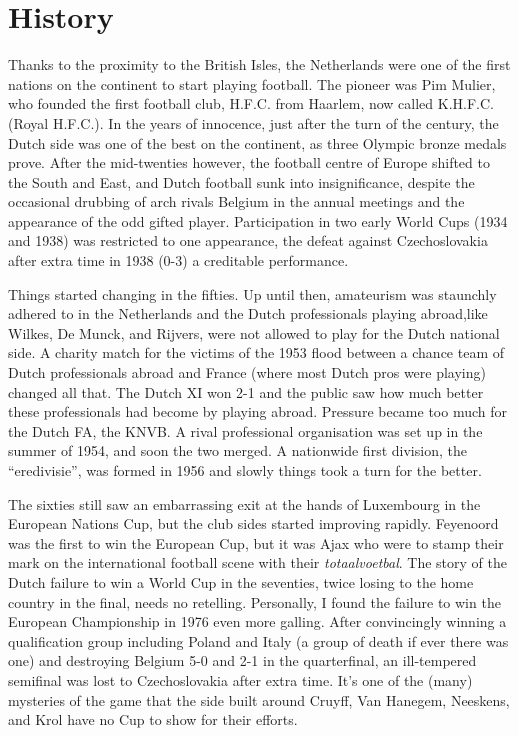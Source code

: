 \section{History}
Thanks to the proximity to the British Isles, the Netherlands were one of the 
first nations on the continent to start playing football. The pioneer was Pim 
Mulier, who founded the first football club, H.F.C. from Haarlem, now called 
K.H.F.C. (Royal H.F.C.). In the years of innocence, just after the turn of the 
century, the Dutch side was one of the best on the continent, as three Olympic 
bronze medals prove. After the mid-twenties however, the football centre of 
Europe shifted to the South and East, and Dutch football sunk into 
insignificance, despite the occasional drubbing of arch rivals Belgium in the 
annual meetings and the appearance of the odd gifted player. Participation in 
two early World Cups (1934 and 1938) was restricted to one appearance, the 
defeat against Czechoslovakia after extra time in 1938 (0-3) a creditable 
performance.

Things started changing in the fifties. Up until then, amateurism was staunchly
adhered to in the Netherlands and the Dutch professionals playing abroad,like 
Wilkes, De Munck, and Rijvers, were not allowed to play for the Dutch national
side. A charity match for the victims of the 1953 flood between a chance team 
of Dutch professionals abroad and France (where most Dutch pros were playing) 
changed all that. The Dutch XI won 2-1 and the public saw how much better these
professionals had become by playing abroad. Pressure became too much for the 
Dutch FA, the KNVB. A rival professional organisation was set up in the summer
of 1954, and soon the two merged. A nationwide first division, the ``eredivisie'',
was formed in 1956 and slowly things took a turn for the better.

The sixties still saw an embarrassing exit at the hands of Luxembourg in the
European Nations Cup, but the club sides started improving rapidly. Feyenoord
was the first to win the European Cup, but it was Ajax who were to stamp their
mark on the international football scene with their \textit{totaalvoetbal}. The story
of the Dutch failure to win a World Cup in the seventies, twice losing to the 
home country in the final, needs no retelling. Personally, I found the failure
to win the European Championship in 1976 even more galling. After convincingly 
winning a qualification group including Poland and Italy (a group of death if 
ever there was one) and destroying Belgium 5-0 and 2-1 in the quarterfinal, an 
ill-tempered semifinal was lost to Czechoslovakia after extra time.  It's one 
of the (many) mysteries of the game that the side built around Cruyff, Van 
Hanegem, Neeskens, and Krol have no Cup to show for their efforts.

